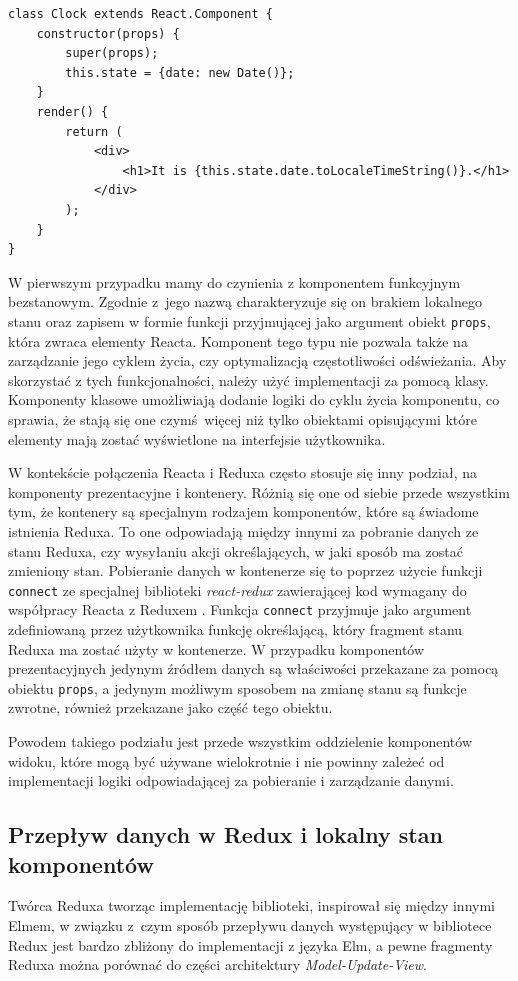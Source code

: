 \begin{lstlisting}[style=JavaScript, caption=Komponent stanowy jako klasa ECMAScript 6, label=listing:statefulcomp]
class Clock extends React.Component {
	constructor(props) {
		super(props);
		this.state = {date: new Date()};
	}
	render() {
		return (
			<div>
				<h1>It is {this.state.date.toLocaleTimeString()}.</h1>
			</div>
		);
	}
}
\end{lstlisting}
W pierwszym przypadku mamy do czynienia z komponentem funkcyjnym bezstanowym. Zgodnie z~jego nazwą charakteryzuje się on brakiem lokalnego stanu oraz zapisem w formie funkcji przyjmującej jako argument obiekt \lstinline{props}, która zwraca elementy Reacta. Komponent tego typu nie pozwala także na zarządzanie jego cyklem życia, czy optymalizacją częstotliwości odświeżania. Aby skorzystać z tych funkcjonalności, należy użyć implementacji za pomocą klasy. Komponenty klasowe umożliwiają dodanie logiki do cyklu życia komponentu, co sprawia, że stają się one czymś więcej niż tylko obiektami opisującymi które elementy mają zostać wyświetlone na interfejsie użytkownika.

W kontekście połączenia Reacta i Reduxa często stosuje się inny podział, na komponenty prezentacyjne i kontenery. Różnią się one od siebie przede wszystkim tym, że kontenery są specjalnym rodzajem komponentów, które są świadome istnienia Reduxa. To one odpowiadają między innymi za pobranie danych ze stanu Reduxa, czy wysyłaniu akcji określających, w jaki sposób ma zostać zmieniony stan. Pobieranie danych w kontenerze się to poprzez użycie funkcji \lstinline{connect} ze specjalnej biblioteki \textit{react-redux} zawierającej kod wymagany do współpracy Reacta z Reduxem \cite{reduxDocs}. Funkcja \lstinline{connect} przyjmuje jako argument zdefiniowaną przez użytkownika funkcję określającą, który fragment stanu Reduxa ma zostać użyty w kontenerze. W przypadku komponentów prezentacyjnych jedynym źródłem danych są właściwości przekazane za pomocą obiektu \lstinline{props}, a jedynym możliwym sposobem na zmianę stanu są funkcje zwrotne, również przekazane jako część tego obiektu.

Powodem takiego podziału jest przede wszystkim oddzielenie komponentów widoku, które mogą być używane wielokrotnie i nie powinny zależeć od implementacji logiki odpowiadającej za pobieranie i zarządzanie danymi.

\subsection{Przepływ danych w Redux i lokalny stan komponentów}
Twórca Reduxa tworząc implementację biblioteki, inspirował się między innymi Elmem, w związku z~czym sposób przepływu danych występujący w bibliotece Redux jest bardzo zbliżony do implementacji z języka Elm, a pewne fragmenty Reduxa można porównać do części architektury \textit{Model-Update-View}.


